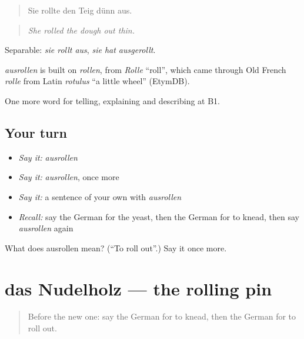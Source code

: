 \begin{quote}
Sie rollte den Teig dünn aus.
\end{quote}

\begin{quote}
\emph{She rolled the dough out thin.}
\end{quote}

Separable: \emph{sie rollt aus}, \emph{sie hat ausgerollt}.

\begin{cousinweb}
\emph{ausrollen} is built on \emph{rollen}, from \emph{Rolle} \textquotedblleft{}roll\textquotedblright{}, which came through Old French \emph{rolle} from Latin \emph{rotulus} \textquotedblleft{}a little wheel\textquotedblright{} (EtymDB).
\end{cousinweb}

\begin{grammarlens}[title={What you've built}]
One more word for telling, explaining and describing at B1.
\end{grammarlens}

\subsection*{Your turn}
\begin{itemize}
\raggedright
  \item \emph{Say it:} \emph{ausrollen}
  \item \emph{Say it:} \emph{ausrollen}, once more
  \item \emph{Say it:} a sentence of your own with \emph{ausrollen}
  \item \emph{Recall:} say the German for the yeast, then the German for to knead, then say \emph{ausrollen} again
\end{itemize}

\begin{tcolorbox}[breakable,colback=teal!4,colframe=teal!35!black,title={Before you move on}]
What does ausrollen mean? (\textquotedblleft{}To roll out\textquotedblright{}.) Say it once more.
\end{tcolorbox}
\section[das Nudelholz]{das Nudelholz — the rolling pin}

\label{lesson:GE-C325-nudelholz}



\begin{quote}
Before the new one: say the German for to knead, then the German for to roll out.
\end{quote}

